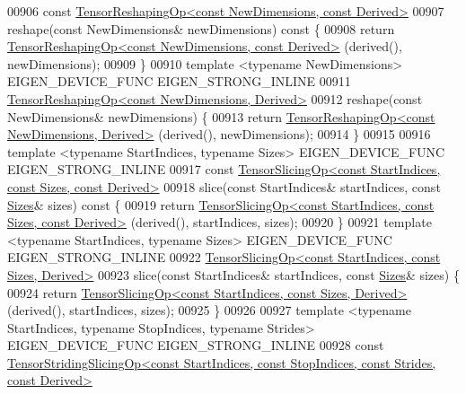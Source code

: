 \begin{DoxyCode}
00906     \textcolor{keyword}{const} \hyperlink{class_eigen_1_1_tensor_reshaping_op}{TensorReshapingOp<const NewDimensions, const Derived>}
00907     reshape(\textcolor{keyword}{const} NewDimensions& newDimensions)\textcolor{keyword}{ const }\{
00908       \textcolor{keywordflow}{return} \hyperlink{class_eigen_1_1_tensor_reshaping_op}{TensorReshapingOp<const NewDimensions, const Derived>}
      (derived(), newDimensions);
00909     \}
00910     \textcolor{keyword}{template} <\textcolor{keyword}{typename} NewDimensions> EIGEN\_DEVICE\_FUNC EIGEN\_STRONG\_INLINE
00911     \hyperlink{class_eigen_1_1_tensor_reshaping_op}{TensorReshapingOp<const NewDimensions, Derived>}
00912     reshape(\textcolor{keyword}{const} NewDimensions& newDimensions) \{
00913       \textcolor{keywordflow}{return} \hyperlink{class_eigen_1_1_tensor_reshaping_op}{TensorReshapingOp<const NewDimensions, Derived>}
      (derived(), newDimensions);
00914     \}
00915 
00916     \textcolor{keyword}{template} <\textcolor{keyword}{typename} StartIndices, \textcolor{keyword}{typename} Sizes> EIGEN\_DEVICE\_FUNC EIGEN\_STRONG\_INLINE
00917     \textcolor{keyword}{const} \hyperlink{class_eigen_1_1_tensor_slicing_op}{TensorSlicingOp<const StartIndices, const Sizes, const Derived>}
00918     slice(\textcolor{keyword}{const} StartIndices& startIndices, \textcolor{keyword}{const} \hyperlink{struct_eigen_1_1_sizes}{Sizes}& sizes)\textcolor{keyword}{ const }\{
00919       \textcolor{keywordflow}{return} \hyperlink{class_eigen_1_1_tensor_slicing_op}{TensorSlicingOp<const StartIndices, const Sizes, const Derived>}
      (derived(), startIndices, sizes);
00920     \}
00921     \textcolor{keyword}{template} <\textcolor{keyword}{typename} StartIndices, \textcolor{keyword}{typename} Sizes> EIGEN\_DEVICE\_FUNC EIGEN\_STRONG\_INLINE
00922     \hyperlink{class_eigen_1_1_tensor_slicing_op}{TensorSlicingOp<const StartIndices, const Sizes, Derived>}
00923     slice(\textcolor{keyword}{const} StartIndices& startIndices, \textcolor{keyword}{const} \hyperlink{struct_eigen_1_1_sizes}{Sizes}& sizes) \{
00924       \textcolor{keywordflow}{return} \hyperlink{class_eigen_1_1_tensor_slicing_op}{TensorSlicingOp<const StartIndices, const Sizes, Derived>}
      (derived(), startIndices, sizes);
00925     \}
00926 
00927     \textcolor{keyword}{template} <\textcolor{keyword}{typename} StartIndices, \textcolor{keyword}{typename} StopIndices, \textcolor{keyword}{typename} Str\textcolor{keywordtype}{id}es> EIGEN\_DEVICE\_FUNC 
      EIGEN\_STRONG\_INLINE
00928     \textcolor{keyword}{const} 
      \hyperlink{class_eigen_1_1_tensor_striding_slicing_op}{TensorStridingSlicingOp<const StartIndices, const StopIndices, const Strides, const Derived>}

\end{DoxyCode}
